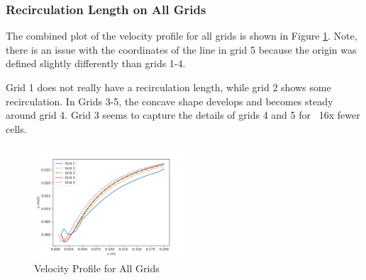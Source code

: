 \subsubsection{Recirculation Length on All Grids}
The combined plot of the velocity profile for all grids is shown in Figure \ref{fig:velocity_profile_all_grids}. Note, there is an issue with the coordinates of the line in grid 5 because the origin was defined slightly differently than grids 1-4.

Grid 1 does not really have a recirculation length, while grid 2 shows some recirculation. In Grids 3-5, the concave shape develops and becomes steady around grid 4. Grid 3 seems to capture the details of grids 4 and 5 for ~16x fewer cells.

\begin{figure}[H]
    \centering
    \includegraphics[width=0.5\textwidth]{Questions/Figures/recirc_combined.png}
    \caption{Velocity Profile for All Grids}
    \label{fig:velocity_profile_all_grids}
\end{figure}

